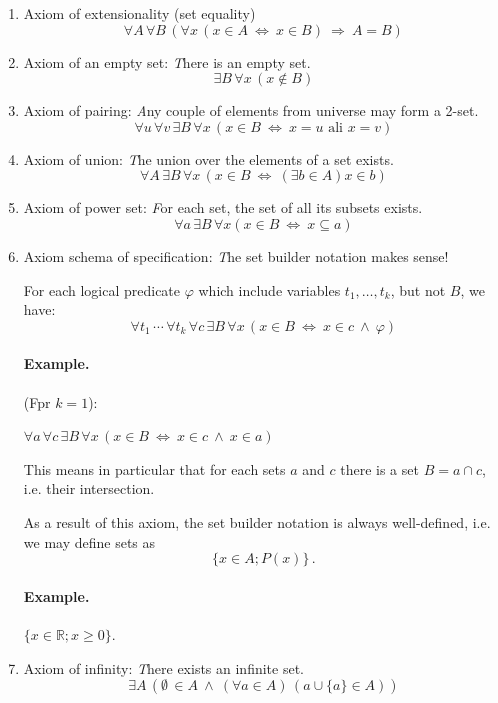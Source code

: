 \documentclass[11pt,paper=b5,footinclude,headinclude]{scrbook} %
\def\inn {{~\wedge~}}
\def\sledi {{~\Rightarrow~}}
\def\cee {{~\Leftrightarrow~}}
\theoremstyle{remark}
\theoremstyle{definition} %
\begin{document}
\begin{enumerate}
	\item Axiom of extensionality (set equality)
	$$\forall A\, \forall B\, (\forall x \,(x\in A \cee x\in B) \sledi A = B)$$
	
	\item Axiom of an empty set:
	{\emph There is an empty set.}
	$$\exists B\, \forall x\, (x\not \in B)$$
	
	\item Axiom of pairing: {\emph Any couple of elements from universe may form a 2-set.}
	$$\forall u\, \forall v\, \exists B\, \forall x\, (x\in B \cee x = u\textrm{ ali }x = v)$$
	
	\item Axiom of union: {\emph The union over the elements of a set exists. }
	$$\forall A\, \exists B\, \forall x\, (x\in B \cee (\exists b\in A) x\in b)$$
	
	\item Axiom of power set: {\emph For each set, the set of all its subsets exists.}
	$$\forall a\, \exists B\, \forall x (x\in B \cee x\subseteq a)$$
	
	\item Axiom schema of specification: {\emph  The set builder notation makes sense!}
	
	For each logical predicate $\varphi$ which include variables $t_1,\ldots, t_k$, but not  $B$, we have:
	$$\forall t_1\,\cdots\, \forall t_k\,\forall c\,\exists B \,\forall x \,(x\in B \cee x\in c \inn \varphi)$$
	
	\paragraph{Example.}
	(Fpr $k = 1$):
	
	$\forall a \,\forall c \,\exists B \, \forall x\, (x\in B \cee x\in c \inn x\in a)$
	
	This means in particular that for each sets $a$ and $c$ there is a set  $B = a\cap c$, i.e. their intersection.
	
	\medskip
	As a result of this axiom, the set builder notation is always well-defined, i.e. we may define sets as
	$$\{x\in A; P(x)\}\,.$$
	
	\paragraph{Example.} $\{x\in \mathbb{R}; x\ge 0\}$.
	
	\item Axiom of infinity: {\emph There exists an infinite set.}
	$$\exists A\,(\emptyset \,\in A \inn (\forall a\in A)\, (a\cup \{a\}\in A))$$
	


\end{enumerate}
\end{document}
